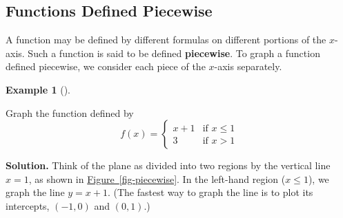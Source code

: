 \documentclass[10pt,]{book}
\newcommand{\terminology}[1]{\textbf{#1}}
\theoremstyle{plain}
\theoremstyle{definition}
\theoremstyle{definition}
\newtheorem{example}[theorem]{Example}
\numberwithin{equation}{section}
\newcounter{figstack}
\newlength\fight
\newcommand\pushValignCaptionBottom[5][b]{%
\stepcounter{figstack}%
\expandafter\def\csname %
figalign\romannumeral\value{figstack}\endcsname{#1}%
\expandafter\def\csname %
figtype\romannumeral\value{figstack}\endcsname{#2}%
\expandafter\def\csname %
figwd\romannumeral\value{figstack}\endcsname{#3}%
\expandafter\def\csname %
figcontent\romannumeral\value{figstack}\endcsname{#4}%
\expandafter\def\csname %
figcap\romannumeral\value{figstack}\endcsname{#5}%
\setbox0=\hbox{%
\begin{#2}{#3}#4\end{#2}}%
\ifdim\dimexpr\ht0+\dp0\relax>\fight\global\setlength{\fight}{%
\dimexpr\ht0+\dp0\relax}\fi%
}
\newcommand{\gt}{ > }
\newcommand{\amp}{ & }
\begin{document}
\subsection[Functions Defined Piecewise]{Functions Defined Piecewise}\label{subsection-41}

        A function may be defined by different formulas on different portions of the \(x\)-axis. Such a function is said to be defined \terminology{piecewise}. To graph a function defined piecewise, we consider each piece of the \(x\)-axis separately.
\begin{example}[]\label{example-piecewise}

        Graph the function defined by   
        \begin{equation*}
            f(x) =
            \begin{cases}
            x +1  \amp \text{if } x\le 1\\
            3  \amp \text{if } x\gt 1
            \end{cases}
        \end{equation*}
\par\medskip\noindent%
\textbf{Solution.}\quad 
        Think of the plane as divided into two regions by the vertical line \(x = 1\), as shown in \hyperref[fig-piecewise]{Figure~\ref{fig-piecewise}}. In the left-hand region (\(x \le 1\)), we graph the line \(y = x + 1\). (The fastest way to graph the line is to plot its intercepts, \((−1, 0)\) and \((0, 1)\).) 
\leavevmode%
\end{example}
\end{document}
